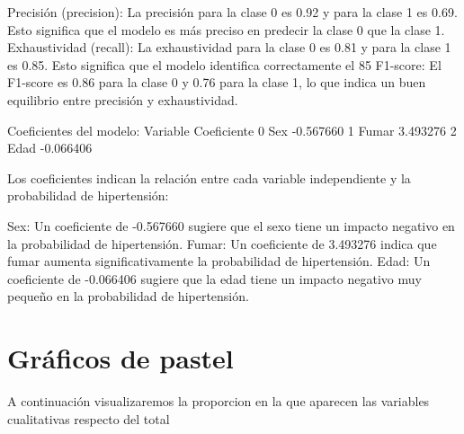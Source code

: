 \documentclass[a4paper, 12pt]{article}
\begin{document}
Precisión (precision): La precisión para la clase 0 es 0.92 y para la clase 1 es 0.69. Esto significa que el modelo es más preciso en predecir la clase 0 que la clase 1.
Exhaustividad (recall): La exhaustividad para la clase 0 es 0.81 y para la clase 1 es 0.85. Esto significa que el modelo identifica correctamente el 85%
F1-score: El F1-score es 0.86 para la clase 0 y 0.76 para la clase 1, lo que indica un buen equilibrio entre precisión y exhaustividad.

Coeficientes del modelo:
  Variable  Coeficiente
0      Sex    -0.567660
1    Fumar     3.493276
2     Edad    -0.066406

Los coeficientes indican la relación entre cada variable independiente y la probabilidad de hipertensión:

Sex: Un coeficiente de -0.567660 sugiere que el sexo tiene un impacto negativo en la probabilidad de hipertensión.
Fumar: Un coeficiente de 3.493276 indica que fumar aumenta significativamente la probabilidad de hipertensión.
Edad: Un coeficiente de -0.066406 sugiere que la edad tiene un impacto negativo muy pequeño en la probabilidad de hipertensión.


\newpage

\section{Gráficos de pastel}
A continuación visualizaremos la proporcion en la que aparecen las variables cualitativas respecto del total
\end{document}
